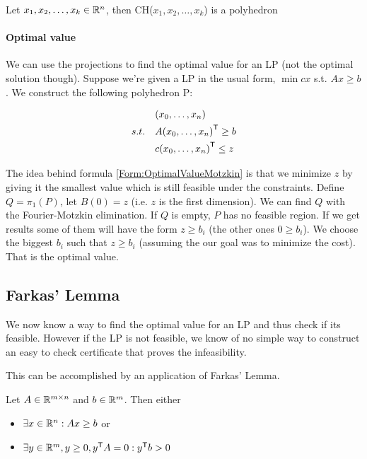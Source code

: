 \begin{cor} Let $x_1,x_2,\ldots, x_k \in \mathbb{R}^n$, then CH($x_1,x_2,\ldots, x_k$) is a polyhedron\end{cor}

\paragraph*{Optimal value} We can use the projections to find the optimal value for an LP (not the optimal solution though). Suppose we're given a LP in the usual form, $\min cx$ s.t. $Ax\geq b$. We construct the following polyhedron P:

\begin{align}  \notag
 & (x_0,\ldots,x_n)  \\ \notag
s.t.\quad & A{(x_0,\ldots,x_n)}^\text{\upshape \sffamily T} \geq b \\
& c{(x_0,\ldots,x_n)}^\text{\upshape \sffamily T}  \leq z \label{Form:OptimalValueMotzkin}
\end{align}

The idea behind formula \ref{Form:OptimalValueMotzkin} is that we minimize $z$ by giving it the smallest value which is still feasible under the constraints.
Define $Q = \pi_1(P)$, let $B(0)=z$ (i.e. $z$ is the first dimension). We can find $Q$ with the Fourier-Motzkin elimination. If $Q$ is empty, $P$ has no feasible region. If we get results some of them will have the form $z \geq b_i$ (the other ones $0 \geq b_i$). We choose the biggest $b_i$ such that $z \geq b_i$ (assuming the our goal was to minimize the cost). That is the optimal value. 

\subsection{Farkas' Lemma}
We now know a way to find the optimal value for an LP and thus check if its feasible. However if the LP is not feasible, we know of no simple way to construct an easy to check certificate that proves the infeasibility.

This can be accomplished by an application of Farkas' Lemma.

\begin{thm}\label{Thm:farkasI} Let $A\in \mathbb{R}^{m\times n}$ and $b\in \mathbb{R}^m$. Then either 
\begin{itemize}
\item $\exists x\in \mathbb{R}^n: Ax\geq b$ or
\item $\exists y\in \mathbb{R}^m, y\geq 0, {y}^\text{\upshape \sffamily T} A=0: {y}^\text{\upshape \sffamily T} b>0$
\end{itemize}
\end{thm} 

